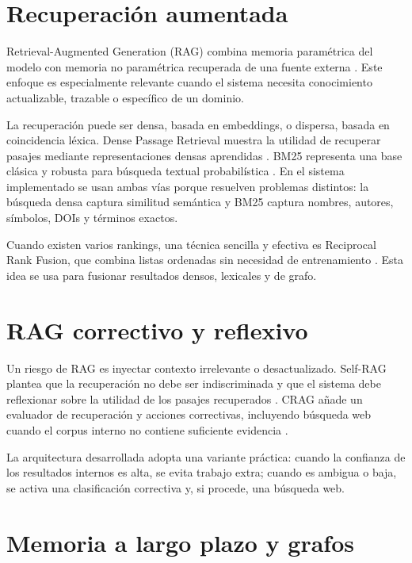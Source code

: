 \section{Recuperación aumentada}

Retrieval-Augmented Generation (RAG) combina memoria paramétrica del modelo con
memoria no paramétrica recuperada de una fuente externa \cite{lewis2020rag}.
Este enfoque es especialmente relevante cuando el sistema necesita conocimiento
actualizable, trazable o específico de un dominio.

La recuperación puede ser densa, basada en embeddings, o dispersa, basada en
coincidencia léxica. Dense Passage Retrieval muestra la utilidad de recuperar
pasajes mediante representaciones densas aprendidas \cite{karpukhin2020dpr}.
BM25 representa una base clásica y robusta para búsqueda textual probabilística
\cite{robertson2009bm25}. En el sistema implementado se usan ambas vías porque
resuelven problemas distintos: la búsqueda densa captura similitud semántica y
BM25 captura nombres, autores, símbolos, DOIs y términos exactos.

Cuando existen varios rankings, una técnica sencilla y efectiva es Reciprocal
Rank Fusion, que combina listas ordenadas sin necesidad de entrenamiento
\cite{cormack2009rrf}. Esta idea se usa para fusionar resultados densos,
lexicales y de grafo.

\section{RAG correctivo y reflexivo}

Un riesgo de RAG es inyectar contexto irrelevante o desactualizado. Self-RAG
plantea que la recuperación no debe ser indiscriminada y que el sistema debe
reflexionar sobre la utilidad de los pasajes recuperados \cite{asai2023selfrag}.
CRAG añade un evaluador de recuperación y acciones correctivas, incluyendo
búsqueda web cuando el corpus interno no contiene suficiente evidencia
\cite{yan2024crag}.

La arquitectura desarrollada adopta una variante práctica: cuando la confianza
de los resultados internos es alta, se evita trabajo extra; cuando es ambigua o
baja, se activa una clasificación correctiva y, si procede, una búsqueda web.

\section{Memoria a largo plazo y grafos}

